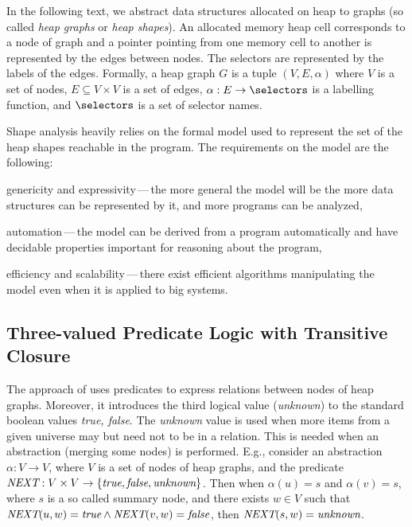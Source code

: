 In the following text, we abstract data structures allocated on heap to graphs (so called \emph{heap graphs}
or \emph{heap shapes}).
An allocated memory heap cell corresponds to a node of graph and a pointer pointing from one memory cell
to another is represented by the edges between nodes.
The selectors are represented by the labels of the edges.
Formally, a heap graph $G$ is a tuple $(V,E,\alpha)$ where $V$ is a set of nodes, $E \subseteq V \times V$ is
a set of edges, $\alpha: E \rightarrow \selectors$ is a labelling function, and $\selectors$ is a set
of selector names.

	  Shape analysis heavily relies on the formal model used to represent the set of the heap shapes
	  reachable in the program.
	  The requirements on the model are the following:
	  \begin{enumerate*}[label=(\alph*)]
	  	\item genericity and expressivity\,---\,the more general the model will be the more data structures can be
	  		represented by it, and more programs can be analyzed,
	  	\item automation\,---\,the model can be derived from a program automatically and have decidable
			properties important for reasoning about the program,
	  	\item efficiency and scalability\,---\,there exist efficient algorithms manipulating the model
			even when it is applied to big systems.
	  \end{enumerate*}

	  \subsection{Three-valued Predicate Logic with Transitive Closure}
	  \label{subsec:tvl}
	  The approach of \cite{pale} uses predicates to express relations between nodes of heap graphs.
	  Moreover, it introduces the third logical value (\emph{unknown}) to the standard
	  boolean values \emph{true, false}. The \emph{unknown} value is used when
	  more items from a given universe may but need not to be in a relation.
	  This is needed when an abstraction (merging some nodes) is performed. E.g., consider
	  an abstraction $\alpha: V \rightarrow V$, where $V$ is a set of nodes
	  of heap graphs, and the predicate $\emph{NEXT}: V \times V\rightarrow\{\emph{true}, \emph{false}, \emph{unknown}\}$.
	  Then when $\alpha(u) = s$ and $\alpha(v) = s$, where $s$ is a so called summary node,
	  and there exists $w \in V$ such that $\emph{NEXT}(u,w) = \emph{true} \wedge
	  \emph{NEXT}(v,w) = \emph{false}$, then $\emph{NEXT}(s,w) = \emph{unknown}$.

